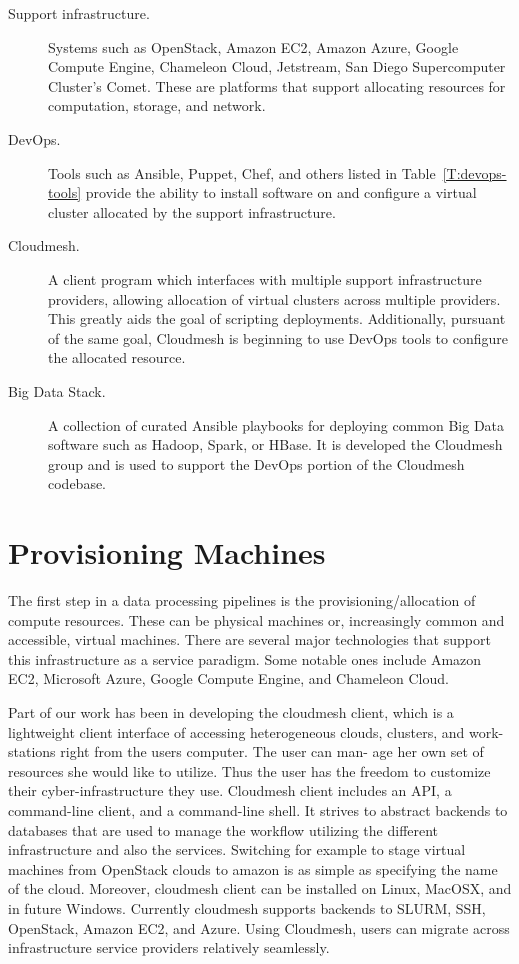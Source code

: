 \documentclass[9pt,twocolumn,twoside]{styles/osajnl}
\begin{document}
\begin{description}
\item[Support infrastructure.] Systems such as OpenStack, Amazon EC2,
  Amazon Azure, Google Compute Engine, Chameleon Cloud, Jetstream, San
  Diego Supercomputer Cluster's Comet. These are platforms that
  support allocating resources for computation, storage, and network. 
\item[DevOps.] Tools such as Ansible, Puppet, Chef, and others listed
  in Table~\ref{T:devops-tools} provide the ability to install
  software on and configure a virtual cluster allocated by the support
  infrastructure.
\item[Cloudmesh.] A client program which interfaces with multiple
  support infrastructure providers, allowing allocation of virtual
  clusters across multiple providers. This greatly aids the goal of
  scripting deployments. Additionally, pursuant of the same goal,
  Cloudmesh is beginning to use DevOps tools to configure the
  allocated resource.
\item[Big Data Stack.] A collection of curated Ansible playbooks for
  deploying common Big Data software such as Hadoop, Spark, or
  HBase. It is developed the Cloudmesh group and is used to support
  the DevOps portion of the Cloudmesh codebase.
\end{description}



\section{Provisioning Machines}



The first step in a data processing pipelines is the
provisioning/allocation of compute resources. These can be physical
machines or, increasingly common and accessible, virtual
machines. There are several major technologies that support this
infrastructure as a service paradigm. Some notable ones include Amazon
EC2, Microsoft Azure, Google Compute Engine, and Chameleon Cloud.


Part of our work has been in developing the cloudmesh client, which is
a lightweight client interface of accessing heterogeneous clouds,
clusters, and work- stations right from the users computer. The user
can man- age her own set of resources she would like to utilize. Thus
the user has the freedom to customize their cyber-infrastructure
they use. Cloudmesh client includes an API, a command-line client, and
a command-line shell. It strives to abstract backends to databases
that are used to manage the workflow utilizing the different
infrastructure and also the services. Switching for example to stage
virtual machines from OpenStack clouds to amazon is as simple as
specifying the name of the cloud. Moreover, cloudmesh client can be
installed on Linux, MacOSX, and in future Windows.  Currently
cloudmesh supports backends to SLURM, SSH, OpenStack, Amazon EC2, and
Azure. Using Cloudmesh, users can migrate across infrastructure
service providers relatively seamlessly.
\end{document}
